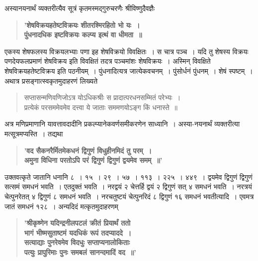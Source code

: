 \documentclass[11pt, openany]{book}
\begin{document}
\vspace{-2mm}
 अस्यानयनार्थं व्यक्तरीत्यैव सूत्रं कृतमस्मद्गुरुचरणैः श्रीविष्णुदैवज्ञैः\textendash
\begin{quote}
    \qt \textbf{'शेषविक्रयहतेष्टविक्रयः शीतरश्मिरहितो भो यः~। \\
 पुंधनादधिक इष्टविक्रयः कल्प्य इत्थं वा धीमता~॥}
\end{quote}
 
 एकस्य शेषफलस्य विक्रयलभ्याः पणा इह शेषविक्रयो विवक्षितः~। स चात्र
 पञ्च~। यदि तु शेषस्य विक्रयः पणदेयफलप्रमाणं शेषविक्रय इति विवक्षितं
तदत्र
 पञ्चमांशः शेषविक्रयः~। अस्मिन् विवक्षिते शेषविक्रयहतेष्टविक्रय 
इति पठनीयम्~।
पुंधनादित्यत्र जात्येकवचनम्~। पुंसोर्धनं  पुंधनम्~। शेषं स्पष्टम्~। \\

\vspace{-2mm}
 अथात्र प्रसङ्गात्स्वकृतमुदाहरणं लिख्यते\textendash
\begin{quote}
    {\qt सप्तासन्मणिवणिजोऽत्र योऽधिकश्रीः स प्रादात्परधनसम्मितं परेभ्यः~। \\
 प्रत्येकं परसममेवमेव दत्त्वा ये जाताः सममणयोऽङ्ग किं धनास्ते~॥}~
\end{quote}
  
 अत्र मणिप्रमाणानि यावत्तावदादीनि प्रकल्प्यानेकवर्णसमीकरणेन साध्यानि~।
 अस्या-नयनार्थं व्यक्तरीत्या मत्सूत्रमप्यस्ति~। तद्यथा\textendash
\begin{quote}
    \ab 
    \qt \textbf{'वद सैकनरैर्मितमेकधनं द्विगुणं विधुहीनमिदं तु परम्~। \\
 अमुना विधिना परतोऽपि परं द्विगुणं द्विगुणं द्वयमेव समम्~॥'}
\end{quote}
 
 उक्तवत्कृते जातानि धनानि ८~। १५~। २९~। ५७~। ११३~। २२५~।
 ४४९~। द्वयमेव द्विगुणं द्विगुणं सत्समं समधनं भवति~। एतदुक्तं भवति~।
 नरद्वयं २ चेत्तर्हि द्वयं २ द्विगुणं सत् ४ समधनं भवति~। नरत्रयं
चेत्पुनरेतत् ४
 द्विगुणं ८ समधनं भवति~। नरचतुष्टयं चेत्पुनरिदं ८ द्विगुणं १६ समधनं
भवतीत्यादि~। एवमत्र जातं समधनं १२८~। अन्यदिदं मत्कृतमुदाहरणम्\textendash
\begin{quote}
    \qt \textbf{'श्रीकृष्णेन यदिन्द्रनीलपटलं क्रीतं प्रियार्थं ततो \\
 भागं भीष्मसुताष्टमं यदधिकं रूपं तदप्याददे~। \\
 सत्याद्याः पुनरेवमेव विदधुः सप्ताप्यनालोकिताः\\
 पत्युः प्रापुरिमाः पुनः समबलं सानन्दमादिं वद~॥'}\\
\end{quote}
\end{document}
